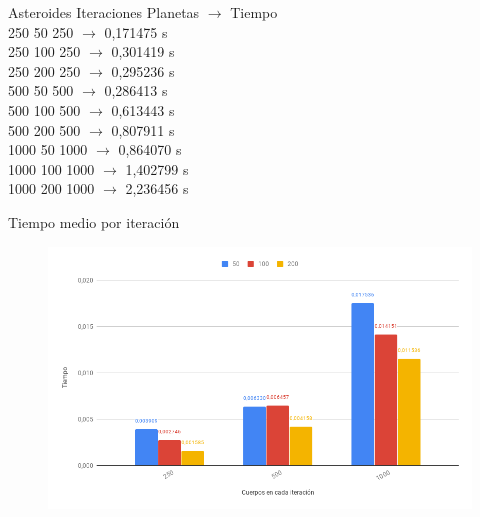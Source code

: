 \documentclass[12pt]{article}
\begin{document}
\begin{enumerate}[label=(\Alph*)]
                \begin{center}
                    \noindent Asteroides Iteraciones Planetas $\rightarrow$ Tiempo \\
                    250 50 250 $\rightarrow$ 0,171475 s \\
                    250 100 250 $\rightarrow$ 0,301419 s \\
                    250 200 250 $\rightarrow$ 0,295236 s \\
                    500 50 500 $\rightarrow$ 0,286413 s \\
                    500 100 500 $\rightarrow$ 0,613443 s \\
                    500 200 500 $\rightarrow$ 0,807911 s \\
                    1000 50 1000 $\rightarrow$ 0,864070 s \\
                    1000 100 1000 $\rightarrow$ 1,402799 s \\
                    1000 200 1000 $\rightarrow$ 2,236456 s \\
                \end{center}
                
                \newpage
                \begin{center}
                    Tiempo medio por iteración
                \end{center}
                \begin{figure}[hbt!]
                    \centering
                    \includegraphics[width=\linewidth]{images/chart10.png}
                \end{figure}
                

\end{enumerate}
\end{document}

